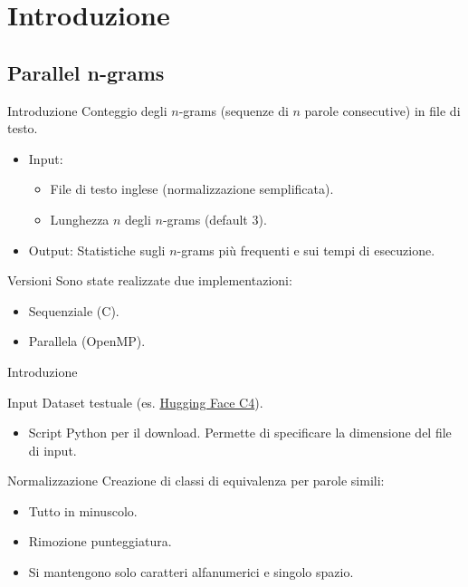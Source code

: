 \section{Introduzione}
\subsection{Parallel n-grams}

\begin{frame}{Introduzione}
        Conteggio degli $n$-grams (sequenze di $n$ parole consecutive) in file di testo.
        \begin{itemize}
            \item Input:
            \begin{itemize}
                \item File di testo inglese (normalizzazione semplificata).
                \item Lunghezza $n$ degli $n$-grams (default 3).
            \end{itemize}
            \item Output: Statistiche sugli $n$-grams più frequenti e sui tempi di esecuzione.
        \end{itemize}
    \begin{block}{Versioni}
        Sono state realizzate due implementazioni:
        \begin{itemize}
            \item Sequenziale (C).
            \item Parallela (OpenMP).
        \end{itemize}
    \end{block}
\end{frame}

\begin{frame}{Introduzione}
    \begin{block}{Input}
        Dataset testuale (es. \href{https://huggingface.co/datasets/allenai/c4/tree/main/en}{Hugging Face C4}).
        \begin{itemize}
            \item Script Python per il download. Permette di specificare la dimensione del file di input.
        \end{itemize}
    \end{block}
    \begin{block}{Normalizzazione}
        Creazione di classi di equivalenza per parole simili:
        \begin{itemize}
            \item Tutto in minuscolo.
            \item Rimozione punteggiatura.
            \item Si mantengono solo caratteri alfanumerici e singolo spazio.
        \end{itemize}
    \end{block}
\end{frame}

